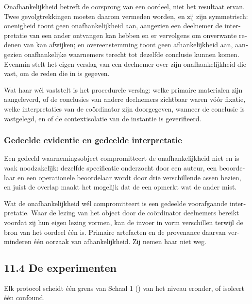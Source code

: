 \begin{dutch}
Onafhankelijkheid betreft de oorsprong van een oordeel, niet het resultaat ervan. Twee gevolgtrekkingen moeten daarom vermeden worden, en zij zijn symmetrisch: onenigheid toont geen onafhankelijkheid aan, aangezien een deelnemer de interpretatie van een ander ontvangen kan hebben en er vervolgens om onverwante redenen van kan afwijken; en overeenstemming toont geen afhankelijkheid aan, aangezien onafhankelijke waarnemers terecht tot dezelfde conclusie kunnen komen. Evenmin stelt het eigen verslag van een deelnemer over zijn onafhankelijkheid die vast, om de reden die in  is gegeven.

Wat haar wél vaststelt is het procedurele verslag: welke primaire materialen zijn aangeleverd, of de conclusies van andere deelnemers zichtbaar waren vóór fixatie, welke interpretaties van de coördinator zijn doorgegeven, wanneer de conclusie is vastgelegd, en of de contextisolatie van de instantie is geverifieerd.


\subsubsection*{Gedeelde evidentie en gedeelde interpretatie}
\label{sec:nl:x-gedeelde-evidentie-en-gedeelde-interpret}

Een gedeeld waarnemingsobject compromitteert de onafhankelijkheid niet en is vaak noodzakelijk: dezelfde specificatie onderzocht door een auteur, een beoordelaar en een operationele beoordelaar wordt door drie verschillende assen bezien, en juist de overlap maakt het mogelijk dat de een opmerkt wat de ander mist.

Wat de onafhankelijkheid wél compromitteert is een gedeelde voorafgaande interpretatie. Waar de lezing van het object door de coördinator deelnemers bereikt voordat zij hun eigen lezing vormen, kan de invoer in vorm verschillen terwijl de bron van het oordeel één is. Primaire artefacten en de provenance daarvan verminderen één oorzaak van afhankelijkheid. Zij nemen haar niet weg.


\subsection*{11.4 De experimenten}
\label{sec:nl:11.4}

Elk protocol scheidt één grens van Schaal 1 () van het niveau eronder, of isoleert één confound.


\end{dutch}
